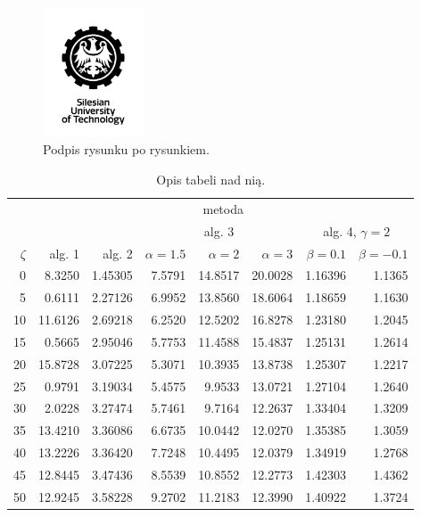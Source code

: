 \documentclass[a4paper,twoside,12pt]{book}
\begin{document}
\begin{figure}
\centering
\includegraphics[width=3cm]{logo.jpg}
\caption{Podpis rysunku po rysunkiem.}
\label{fig:2}
\end{figure}

\begin{table}
\centering
\caption{Opis tabeli nad nią.}
\label{id:tab:wyniki}
\begin{tabular}{rrrrrrrr}
\toprule
	         &                                     \multicolumn{7}{c}{metoda}                                      \\
	         \cmidrule{2-8}
	         &         &         &        \multicolumn{3}{c}{alg. 3}        & \multicolumn{2}{c}{alg. 4, $\gamma = 2$} \\
	         \cmidrule(r){4-6}\cmidrule(r){7-8}
	$\zeta$ &     alg. 1 &   alg. 2 & $\alpha= 1.5$ & $\alpha= 2$ & $\alpha= 3$ &   $\beta = 0.1$  &   $\beta = -0.1$ \\
\midrule
	       0 &  8.3250 & 1.45305 &       7.5791 &    14.8517 &    20.0028 & 1.16396 &                       1.1365 \\
	       5 &  0.6111 & 2.27126 &       6.9952 &    13.8560 &    18.6064 & 1.18659 &                       1.1630 \\
	      10 & 11.6126 & 2.69218 &       6.2520 &    12.5202 &    16.8278 & 1.23180 &                       1.2045 \\
	      15 &  0.5665 & 2.95046 &       5.7753 &    11.4588 &    15.4837 & 1.25131 &                       1.2614 \\
	      20 & 15.8728 & 3.07225 &       5.3071 &    10.3935 &    13.8738 & 1.25307 &                       1.2217 \\
	      25 &  0.9791 & 3.19034 &       5.4575 &     9.9533 &    13.0721 & 1.27104 &                       1.2640 \\
	      30 &  2.0228 & 3.27474 &       5.7461 &     9.7164 &    12.2637 & 1.33404 &                       1.3209 \\
	      35 & 13.4210 & 3.36086 &       6.6735 &    10.0442 &    12.0270 & 1.35385 &                       1.3059 \\
	      40 & 13.2226 & 3.36420 &       7.7248 &    10.4495 &    12.0379 & 1.34919 &                       1.2768 \\
	      45 & 12.8445 & 3.47436 &       8.5539 &    10.8552 &    12.2773 & 1.42303 &                       1.4362 \\
	      50 & 12.9245 & 3.58228 &       9.2702 &    11.2183 &    12.3990 & 1.40922 &                       1.3724 \\
\bottomrule
\end{tabular}
\end{table}  
\end{document}
